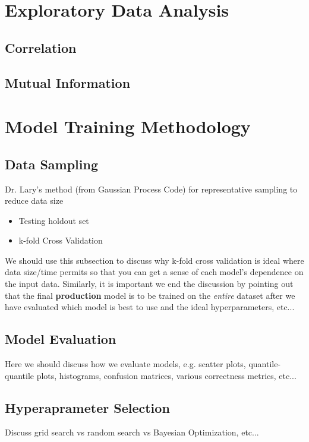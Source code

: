 
\section{Exploratory Data Analysis}
\subsection{Correlation}
\subsection{Mutual Information}



\section{Model Training Methodology}
\subsection{Data Sampling}
Dr. Lary's method (from Gaussian Process Code) for representative sampling to reduce data size
\begin{itemize}
\item Testing holdout set
\item k-fold Cross Validation
\end{itemize}
We should use this subsection to discuss why k-fold cross validation is ideal where data size/time permits so that you can get a sense of each model's dependence on the input data. Similarly, it is important we end the discussion by pointing out that the final \textbf{production} model is to be trained on the \textit{entire} dataset after we have evaluated which model is best to use and the ideal hyperparameters, etc...
\subsection{Model Evaluation}
Here we should discuss how we evaluate models, e.g. scatter plots, quantile-quantile plots, histograms, confusion matrices, various correctness metrics, etc...
\subsection{Hyperaprameter Selection}
Discuss grid search vs random search vs Bayesian Optimization, etc...
